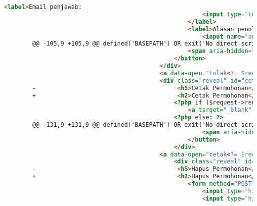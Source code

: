 \begin{itemize}
\begin{lstlisting}[frame=single, label={lst:perbaikan_1.3.1_tag_heading}, language=HTML, caption=Perbaikan Kriteria Sukses 1.3.1 - Penggunaan \textit{Heading} Tidak Tepat]
                                                    <label>Email penjawab:
                                                        <input type="text" value="<?= $answeredByEmail ?>" readonly="true"/>
                                                    </label>
                                                    <label>Alasan penolakan:
                                                        <input name="answeredMessage" class="input-group-field" type="text" required/>
        @@ -105,9 +105,9 @@ defined('BASEPATH') OR exit('No direct script access allowed');
                                                    <span aria-hidden="true">&times;</span>
                                                </button>
                                            </div>
                                            <a data-open="tolak<?= $request->id ?>"><i class="fi-dislike"></i></a>
                                            <div class="reveal" id="cetak<?= $request->id ?>" data-reveal>
        -                                        <h5>Cetak Permohonan</h5>
        +                                        <h2>Cetak Permohonan</h2>
                                                <?php if ($request->requestByNPM !== NULL): ?>
                                                    <a target="_blank" href="<?= sprintf($transkripURLs[$request->requestType], $request->requestByNPM) ?>">Klik untuk membuka DPS/LHS</a>
                                                <?php else: ?>
        @@ -131,9 +131,9 @@ defined('BASEPATH') OR exit('No direct script access allowed');
                                                        <span aria-hidden="true">&times;</span>
                                                    </button>
                                                </div>
                                            <a data-open="cetak<?= $request->id ?>"><i class="fi-print"></i></a>
                                                <div class="reveal" id="hapus<?= $request->id ?>" data-reveal>
        -                                        <h5>Hapus Permohonan</h5>
        +                                        <h2>Hapus Permohonan</h2>
                                                    <form method="POST" action="/TranskripManage/remove">
                                                        <input type="hidden" name="<?= $this->security->get_csrf_token_name() ?>" value="<?= $this->security->get_csrf_hash() ?>" />
                                                        <input type="hidden" name="id" value="<?= $request->id ?>"/>


\end{lstlisting}
\end{itemize}
